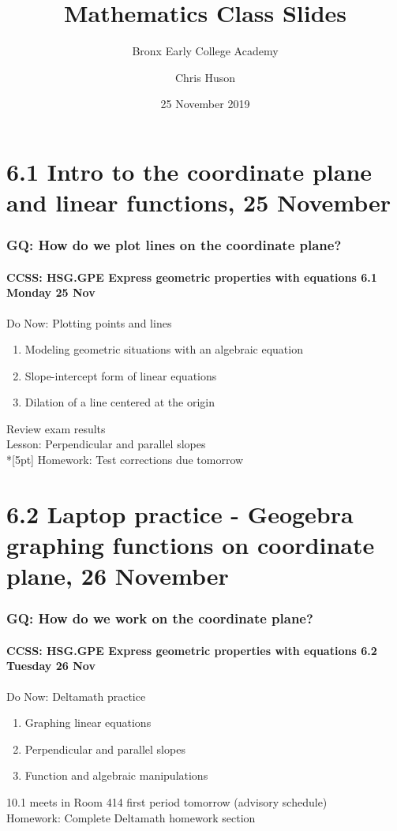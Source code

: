 \documentclass{beamer}
\title{Mathematics Class Slides}
\subtitle{Bronx Early College Academy}
\author{Chris Huson}
\date{25 November 2019}
\begin{document}
\frame{\titlepage}
\section[Outline]{}
\frame{\tableofcontents}

\section{6.1 Intro to the coordinate plane and linear functions, 25 November}
  \frame
  {
    \frametitle{GQ: How do we plot lines on the coordinate plane?}
    \framesubtitle{CCSS: HSG.GPE Express geometric properties with equations \hfill \alert{6.1 Monday 25 Nov}}

    \begin{block}{Do Now: Plotting points and lines}
    \begin{enumerate}
      \item Modeling geometric situations with an algebraic equation
      \item Slope-intercept form of linear equations
      \item Dilation of a line centered at the origin
    \end{enumerate}
    \end{block}
    Review exam results \\
    Lesson: Perpendicular and parallel slopes \\*[5pt]
    Homework: Test corrections due \alert{tomorrow}
  }

\section{6.2 Laptop practice - Geogebra graphing functions on coordinate plane, 26 November}
\frame
{
\frametitle{GQ: How do we work on the coordinate plane?}
\framesubtitle{CCSS: HSG.GPE Express geometric properties with equations \hfill \alert{6.2 Tuesday 26 Nov}}

\begin{block}{Do Now: Deltamath practice}
\begin{enumerate}
  \item Graphing linear equations
  \item Perpendicular and parallel slopes
  \item Function and algebraic manipulations
\end{enumerate}
\end{block}
10.1 meets in Room 414 first period tomorrow (advisory schedule)\\[0.5cm]
Homework: Complete Deltamath homework section
}
\end{document}
